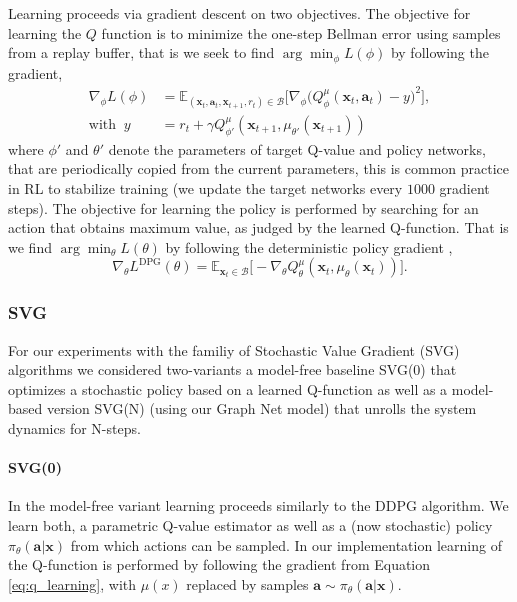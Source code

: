Learning proceeds via gradient descent on two objectives. The objective for learning the $Q$ function is to minimize the one-step Bellman error using samples from a replay buffer, that is we seek to find $\arg \min_\phi L(\phi)$ by following the gradient,
\begin{equation}
\begin{aligned}
\nabla_\phi L(\phi) &= \mathbb{E}_{(\mathbf{x}_t, \mathbf{a}_t, \mathbf{x}_{t+1}, r_t) \in \mathcal{B}} \Big[ \nabla_\phi \big( Q^\mu_\phi(\mathbf{x}_t, \mathbf{a}_t) - y \big)^2\Big], \\
\text{with } \ y &= r_t + \gamma Q^\mu_{\phi'}(\mathbf{x}_{t+1}, \mu_{\theta'}(\mathbf{x}_{t+1}))
\end{aligned}
\label{eq:q_learning}
\end{equation}
where $\phi'$ and $\theta'$ denote the parameters of target Q-value and policy networks, that are periodically copied from the current parameters, this is common practice in RL to stabilize training (we update the target networks every $1000$ gradient steps).
The objective for learning the policy is performed by searching for an action that obtains maximum value, as judged by the learned Q-function. That is we find $\arg \min_\theta L(\theta)$ by following the deterministic policy gradient \cite{Lillicrap16},
\begin{equation}
\nabla_\theta L^{\text{DPG}}(\theta) = \mathbb{E}_{\mathbf{x}_t \in \mathcal{B}} \Big[ - \nabla_\theta Q^\mu_\theta(\mathbf{x}_t, \mu_\theta(\mathbf{x}_t))\Big].
\label{eq:ddpg_grad}
\end{equation}

\subsubsection{SVG}
\label{sm:sec:svg}
For our experiments with the familiy of Stochastic Value Gradient (SVG) \citep{heess2015learning} algorithms we considered two-variants a model-free baseline SVG(0) that optimizes a stochastic policy based on a learned Q-function as well as a model-based version SVG(N) (using our Graph Net model) that unrolls the system dynamics for N-steps.

\paragraph{SVG(0)} In the model-free variant learning proceeds similarly to the DDPG algorithm. We learn both, a parametric Q-value estimator as well as a (now stochastic) policy $\pi_\theta(\mathbf{a} | \mathbf{x})$ from which actions can be sampled. 
In our implementation learning of the Q-function is performed by following the gradient from Equation \eqref{eq:q_learning}, with $\mu(x)$ replaced by samples $\mathbf{a} \sim \pi_\theta(\mathbf{a} | \mathbf{x})$. 

